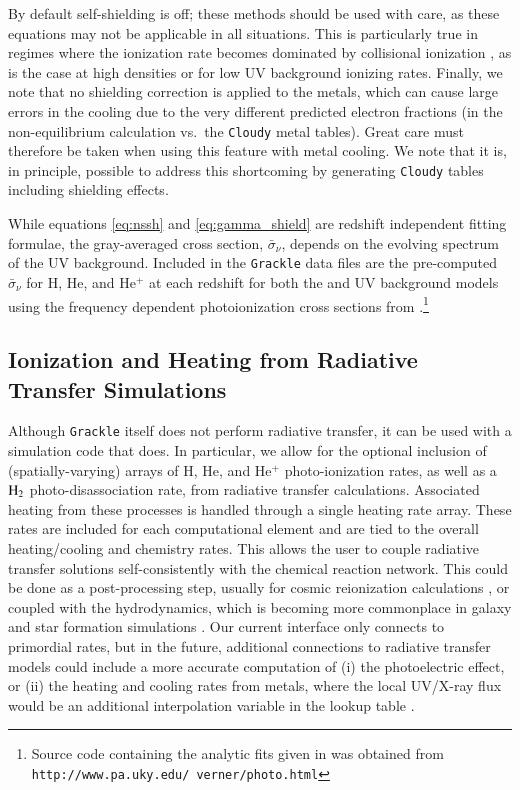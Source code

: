 By default self-shielding is off; these methods should be used with care, as these equations may not be applicable in all situations. This is particularly true in regimes where the ionization rate becomes dominated by collisional ionization \citep{2013MNRAS.430.2427R}, as is the case at high densities or for low UV background ionizing rates.  Finally, we note that no shielding correction is applied to the metals, which can cause large errors in the cooling due to the very different predicted electron fractions (in the non-equilibrium calculation vs.\ the \texttt{Cloudy} metal tables). Great care must therefore be taken when using this feature with metal cooling.  We note that it is, in principle, possible to address this shortcoming by generating \texttt{Cloudy} tables including shielding effects.

While equations \ref{eq:nssh} and \ref{eq:gamma_shield} are redshift independent fitting formulae, the gray-averaged cross section, $\bar{\sigma}_{\nu}$, depends on the evolving spectrum of the UV background. Included in the \texttt{Grackle} data files are the pre-computed $\bar{\sigma}_{\nu}$ for H, He, and He$^+$ at each redshift for both the \citet{2009ApJ...703.1416F} and \citet{2012ApJ...746..125H} UV background models using the frequency dependent photoionization cross sections from \citet{1996ApJ...465..487V}.\footnote{Source code containing the analytic fits given in \citet{1996ApJ...465..487V} was obtained from \texttt{http://www.pa.uky.edu/~verner/photo.html}}


\subsection{Ionization and Heating from Radiative Transfer Simulations}
\label{section:radiative-transfer}

Although \texttt{Grackle} itself does not perform radiative transfer, it can be used with a simulation code that does.  In particular, we allow for the optional inclusion of (spatially-varying) arrays of H, He, and He$^+$ photo-ionization rates, as well as a $\rm{H}_2$ photo-disassociation rate, from radiative transfer calculations. Associated heating from these processes is handled through a single heating rate array. These rates are included for each computational element and are tied to the overall heating/cooling and chemistry rates. This allows the user to couple radiative transfer solutions self-consistently with the chemical reaction network.  This could be done as a post-processing step, usually for cosmic reionization calculations \citep[e.g.][]{2014MNRAS.439..725I, 2016MNRAS.459.2342M}, or coupled with the hydrodynamics, which is becoming more commonplace in galaxy and star formation simulations \citep[e.g.][]{2014MNRAS.442.2560W, 2015MNRAS.451...34R,  2015arXiv151100011O, 2015MNRAS.454..380B, 2016arXiv160300034P, 2016arXiv160703117R}.  Our current interface only connects to primordial rates, but in the future, additional connections to radiative transfer models could include a more accurate computation of (i) the photoelectric effect, or (ii) the heating and cooling rates from metals, where the local UV/X-ray flux would be an additional interpolation variable in the lookup table \citep[e.g.][]{2013ApJ...771...50A}.

